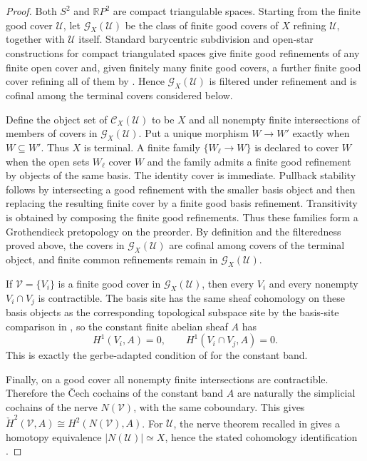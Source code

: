 \begin{proof}
Both $S^2$ and $\mathbb{R}P^2$ are compact triangulable spaces. Starting from
the finite good cover $\mathcal U$, let $\mathcal G_X(\mathcal U)$ be the class
of finite good covers of $X$ refining $\mathcal U$, together with
$\mathcal U$ itself. Standard barycentric subdivision and open-star
constructions for compact triangulated spaces give finite good refinements of
any finite open cover and, given finitely many finite good covers, a further
finite good cover refining all of them by
. Hence
$\mathcal G_X(\mathcal U)$ is filtered under refinement and is cofinal among
the terminal covers considered below.

Define the object set of $\mathcal C_X(\mathcal U)$ to be $X$ and all nonempty
finite intersections of members of covers in $\mathcal G_X(\mathcal U)$. Put a
unique morphism $W\to W'$ exactly when $W\subseteq W'$. Thus $X$ is terminal.
A finite family $\{W_\ell\to W\}$ is declared to cover $W$ when the open sets
$W_\ell$ cover $W$ and the family admits a finite good refinement by objects of
the same basis. The identity cover is immediate. Pullback stability follows by
intersecting a good refinement with the smaller basis object and then replacing
the resulting finite cover by a finite good basis refinement. Transitivity is
obtained by composing the finite good refinements. Thus these families form a
Grothendieck pretopology on the preorder. By definition and the filteredness
proved above, the covers in $\mathcal G_X(\mathcal U)$ are cofinal among covers
of the terminal object, and finite common refinements remain in
$\mathcal G_X(\mathcal U)$.

If $\mathcal V=\{V_i\}$ is a finite good cover in
$\mathcal G_X(\mathcal U)$, then every $V_i$ and every nonempty
$V_i\cap V_j$ is contractible. The basis site has the same sheaf cohomology on
these basis objects as the corresponding topological subspace site by the
basis-site comparison in , so the constant
finite abelian sheaf $A$ has
\[
H^1(V_i,A)=0,
\qquad
H^1(V_i\cap V_j,A)=0.
\]
This is exactly the gerbe-adapted condition of
 for the constant band.

Finally, on a good cover all nonempty finite intersections are contractible.
Therefore the \v{C}ech cochains of the constant band $A$ are naturally the
simplicial cochains of the nerve $N(\mathcal V)$, with the same coboundary.
This gives $\check H^2(\mathcal V,A)\cong H^2(N(\mathcal V),A)$. For
$\mathcal U$, the nerve theorem recalled in
 gives a homotopy equivalence
$|N(\mathcal U)|\simeq X$, hence the stated cohomology identification
\cite[Sec.~4G]{Hatcher2002}.
\end{proof}

